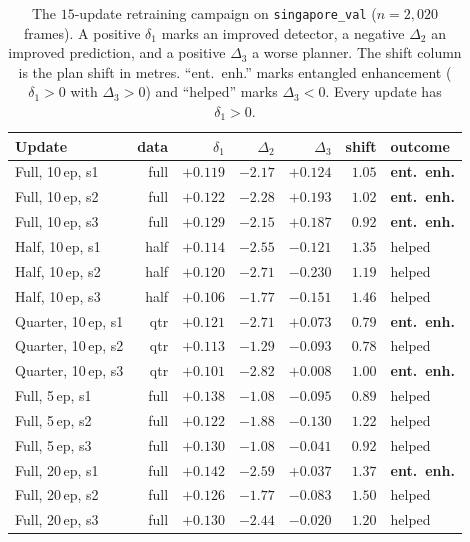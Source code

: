 \documentclass[conference]{IEEEtran}
\begin{document}
\begin{table}[htbp]
\caption{The $15$-update retraining campaign on \texttt{singapore\_val}
($n=2{,}020$ frames). A positive $\delta_1$ marks an improved detector, a negative
$\Delta_2$ an improved prediction, and a positive $\Delta_3$ a worse planner. The
shift column is the plan shift in metres. ``ent.\ enh.'' marks entangled
enhancement ($\delta_1>0$ with $\Delta_3>0$) and ``helped'' marks $\Delta_3<0$.
Every update has $\delta_1>0$.}
\label{tab:campaign}
\centering
\renewcommand{\arraystretch}{1.15}
\setlength{\tabcolsep}{3.5pt}
\footnotesize
\begin{tabular}{@{}lrrrrrl@{}}
\toprule
\textbf{Update} & \textbf{data} & \textbf{$\delta_1$} & \textbf{$\Delta_2$} & \textbf{$\Delta_3$} & \textbf{shift} & \textbf{outcome} \\
\midrule
Full, 10\,ep, s1     & full & $+0.119$ & $-2.17$ & $+0.124$ & $1.05$ & \textbf{ent.\ enh.} \\
Full, 10\,ep, s2     & full & $+0.122$ & $-2.28$ & $+0.193$ & $1.02$ & \textbf{ent.\ enh.} \\
Full, 10\,ep, s3     & full & $+0.129$ & $-2.15$ & $+0.187$ & $0.92$ & \textbf{ent.\ enh.} \\
Half, 10\,ep, s1     & half & $+0.114$ & $-2.55$ & $-0.121$ & $1.35$ & helped \\
Half, 10\,ep, s2     & half & $+0.120$ & $-2.71$ & $-0.230$ & $1.19$ & helped \\
Half, 10\,ep, s3     & half & $+0.106$ & $-1.77$ & $-0.151$ & $1.46$ & helped \\
Quarter, 10\,ep, s1  & qtr  & $+0.121$ & $-2.71$ & $+0.073$ & $0.79$ & \textbf{ent.\ enh.} \\
Quarter, 10\,ep, s2  & qtr  & $+0.113$ & $-1.29$ & $-0.093$ & $0.78$ & helped \\
Quarter, 10\,ep, s3  & qtr  & $+0.101$ & $-2.82$ & $+0.008$ & $1.00$ & \textbf{ent.\ enh.} \\
Full, 5\,ep, s1      & full & $+0.138$ & $-1.08$ & $-0.095$ & $0.89$ & helped \\
Full, 5\,ep, s2      & full & $+0.122$ & $-1.88$ & $-0.130$ & $1.22$ & helped \\
Full, 5\,ep, s3      & full & $+0.130$ & $-1.08$ & $-0.041$ & $0.92$ & helped \\
Full, 20\,ep, s1     & full & $+0.142$ & $-2.59$ & $+0.037$ & $1.37$ & \textbf{ent.\ enh.} \\
Full, 20\,ep, s2     & full & $+0.126$ & $-1.77$ & $-0.083$ & $1.50$ & helped \\
Full, 20\,ep, s3     & full & $+0.130$ & $-2.44$ & $-0.020$ & $1.20$ & helped \\
\bottomrule
\end{tabular}
\end{table}
\end{document}

